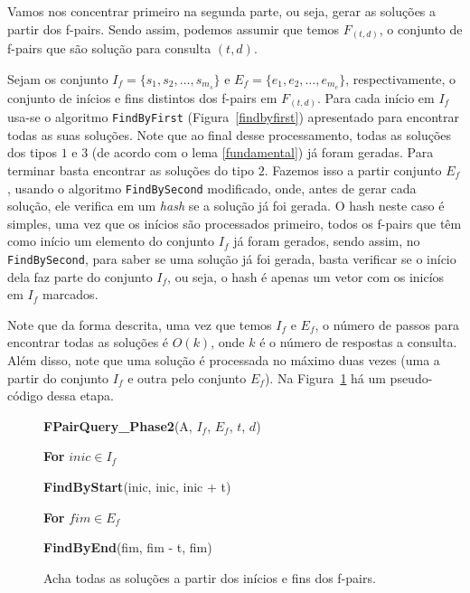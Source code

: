 \documentclass[12pt]{article}
\begin{document}
Vamos nos concentrar primeiro na segunda parte, ou seja, gerar as soluções
a partir dos f-pairs. Sendo assim, podemos assumir que temos 
$F_{(t,d)}$, o conjunto de f-pairs que são solução para
consulta $(t,d)$. 

Sejam os conjunto $I_f = \{s_1, s_2, \ldots, s_{m_s}\}$
e $E_f = \{e_1, e_2, \ldots, e_{m_e}\}$, respectivamente, o conjunto de inícios e fins distintos
dos f-pairs em $F_{(t,d)}$. Para cada início em $I_f$ usa-se o algoritmo \verb|FindByFirst| (Figura~\ref{findbyfirst})
apresentado para encontrar todas as suas soluções.  Note que ao final desse processamento, todas
as soluções dos tipos $1$ e $3$ (de acordo com o lema \ref{fundamental}) já foram geradas. Para terminar
basta encontrar as soluções do tipo $2$. Fazemos isso  a partir conjunto $E_f$, usando o algoritmo
\verb|FindBySecond| modificado, onde, antes de gerar cada solução, ele verifica em um \textit{hash} se a solução
já foi gerada. O hash neste caso é simples, uma vez que os inícios são processados primeiro, todos os
f-pairs que têm como início um elemento do conjunto $I_f$ já foram gerados, sendo assim, no \verb|FindBySecond|,
para saber se uma solução já foi gerada, basta verificar se o início dela faz parte do conjunto $I_f$, ou seja,
o hash é apenas um vetor com os inicíos em $I_f$ marcados.

Note que da forma descrita, uma vez que temos $I_f$ e $E_f$, o número de passos para encontrar todas as soluções é $O(k)$, onde $k$ é o número de respostas a consulta.
Além disso, note que uma solução é processada no máximo duas vezes (uma a partir do conjunto $I_f$ e outra pelo conjunto $E_f$).
Na Figura~\ref{fpairqueryphase2} há um pseudo-código dessa etapa.

\begin{figure}
\begin{framed}
{\bf FPairQuery\_Phase2}(A, $I_f$, $E_f$, $t$, $d$)

\hspace{1cm} {\bf For} $inic \in I_f$

\hspace{2cm} {\bf FindByStart}(inic, inic, inic + t)

\hspace{1cm} {\bf For} $fim \in E_f$

\hspace{2cm} {\bf FindByEnd}(fim, fim - t, fim)

\end{framed}
\caption{Acha todas as soluções a partir dos inícios e fins dos f-pairs.}
\label{fpairqueryphase2}
\end{figure}
\end{document}
